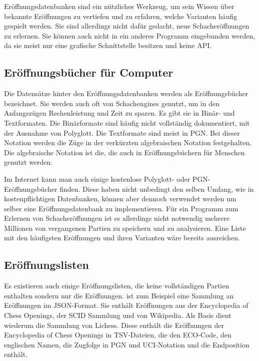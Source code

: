 Eröffnungsdatenbanken sind ein nützliches Werkzeug, um sein Wissen über bekannte Eröffnungen zu vertiefen und zu erfahren, welche Varianten häufig gespielt werden. Sie sind allerdings nicht dafür gedacht, neue Schacheröffnungen zu erlernen. Sie können auch nicht in ein anderes Programm eingebunden werden, da sie meist nur eine grafische Schnittstelle besitzen und keine \ac{API}.

\subsection{Eröffnungsbücher für Computer}
Die Datensätze hinter den Eröffnungsdatenbanken werden als Eröffnungsbücher bezeichnet. Sie werden auch oft von Schachengines genutzt, um in den Anfangszügen Rechenleistung und Zeit zu sparen. Es gibt sie in Binär- und Textformaten. Die Binärformate sind häufig nicht vollständig dokumentiert, mit der Ausnahme von Polyglott. Die Textformate sind meist in \ac{PGN}.
Bei dieser Notation werden die Züge in der verkürzten algebraischen Notation festgehalten. Die algebraische Notation ist die, die auch in Eröffnungsbüchern für Menschen genutzt werden.
\cite{wikipedia_foundation_inc_chess_2025}

Im Internet kann man auch einige kostenlose Polyglott- oder PGN-Eröffnungsbücher finden. Diese haben nicht unbedingt den selben Umfang, wie in kostenpflichtigen Datenbanken, können aber dennoch verwendet werden um selber eine Eröffnungsdatenbank zu implementieren. Für ein Programm zum Erlernen von Schacheröffnungen ist es allerdings nicht notwendig mehrere Millionen von vergangenen Partien zu speichern und zu analysieren. Eine Liste mit den häufigsten Eröffnungen und ihren Varianten wäre bereits ausreichen.

\subsection{Eröffnungslisten}
Es existieren auch einige Eröffnungslisten, die keine vollständigen Partien enthalten sondern nur die Eröffnungen. \cite{omur_yanikoglu_ecojson_2025} ist zum Beispiel eine Sammlung an Eröffnungen im JSON-Format. Sie enthält Eröffnungen aus der Encyclopedia of Chess Openings, der SCID Sammlung und von Wikipedia. Als Basis dient wiederum die Sammlung \cite{lichessorg_chess-openings_2025} von Lichess. Diese enthält die Eröffnungen der Encyclopedia of Chess Openings in TSV-Dateien, die den ECO-Code, den englischen Namen, die Zugfolge in \ac{PGN} und \ac{UCI}-Notation und die Endposition enthält.

